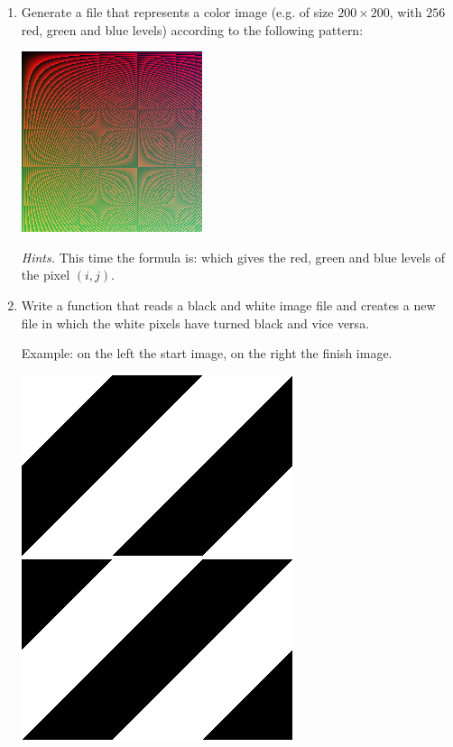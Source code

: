 \documentclass[11pt,class=report,crop=false]{standalone}
\begin{document}
\begin{activite}
\begin{enumerate}
   \item Generate a file  that represents a color image (e.g. of size $200 \times 200$, with $256$ red, green and blue levels) according to the following pattern:
\begin{center}
\includegraphics[scale=\myscale,scale=0.7]{screen-image_coul}
\end{center}   

\emph{Hints.} This time the formula is:
which gives the red, green and blue levels of the pixel $(i,j)$.

\item Write a function  that reads a black and white image file  and creates a new file in which the white pixels have turned black and vice versa. 

Example: on the left the start image, on the right the finish image.
\begin{center}
\includegraphics[scale=\myscale,scale=0.3]{screen-simple_nb}\qquad\qquad
\includegraphics[scale=\myscale,scale=0.3]{screen-simple_nb_inverse}
\end{center} 


\end{enumerate}
\end{activite}
\end{document}
